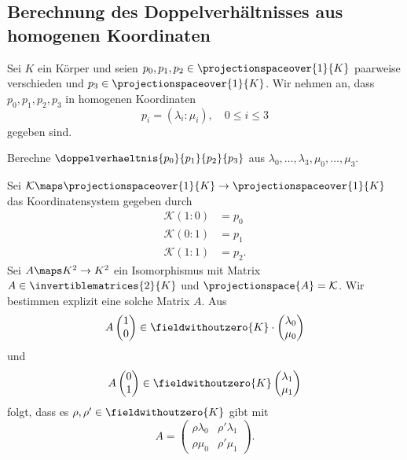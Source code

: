 \subsection*{Berechnung des Doppelverhältnisses aus homogenen Koordinaten}
Sei \( K \) ein Körper und seien \( p_0,p_1,p_2\in \projectionspaceover{1}{K} \) paarweise verschieden und \( p_3\in \projectionspaceover{1}{K} \). Wir nehmen an, dass \( p_0,p_1,p_2,p_3 \) in homogenen Koordinaten
\begin{equation*}
  p_i=(\lambda_i:\mu_i),\quad 0\leq i\leq 3 
\end{equation*}
gegeben sind.
\begin{ziel*}
  Berechne \( \doppelverhaeltnis{p_0}{p_1}{p_2}{p_3} \) aus \( \lambda_0,\dotsc,\lambda_3,\mu_0,\dotsc,\mu_3 \).
\end{ziel*}
Sei \( \mathcal{K}\maps \projectionspaceover{1}{K}\to \projectionspaceover{1}{K} \) das Koordinatensystem gegeben durch
\begin{align*}
  \mathcal{K}(1:0)&=p_0\\
  \mathcal{K}(0:1)&=p_1\\
  \mathcal{K}(1:1)&=p_2.
\end{align*}
Sei \( A\maps K^2\to K^2 \) ein Isomorphismus mit Matrix \( A\in \invertiblematrices{2}{K} \) und \( \projectionspace{A}=\mathcal{K} \). Wir bestimmen explizit eine solche Matrix \( A \). Aus 
\begin{equation*}
  A\begin{pmatrix} 1 \\ 0 \end{pmatrix}\in \fieldwithoutzero{K}\cdot \begin{pmatrix} \lambda_0 \\ \mu_0 \end{pmatrix}
\end{equation*}
und
\begin{equation*}
  A\begin{pmatrix} 0 \\ 1 \end{pmatrix}\in \fieldwithoutzero{K}\begin{pmatrix} \lambda_1 \\ \mu_1 \end{pmatrix}
\end{equation*}
folgt, dass es \( \rho,\rho'\in \fieldwithoutzero{K} \) gibt mit
\begin{equation*}
  A=\begin{pmatrix} \rho \lambda_0 & \rho' \lambda_1 \\ \rho \mu_0 & \rho' \mu_1 \end{pmatrix}.
\end{equation*}
